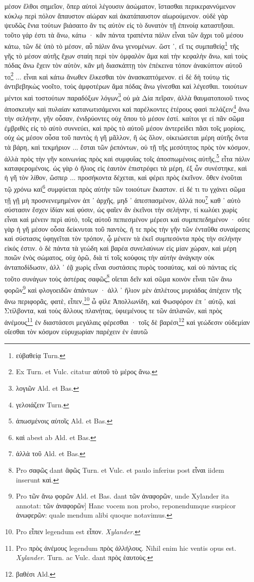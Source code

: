 \documentclass[a4paper, 11pt, oneside, polutonikogreek, german]{article}
\begin{document}
μέσον ἔλθοι σημεῖον, ὅπερ αὐτοὶ λέγουσιν ἀσώματον, ἵστασθαι περικεραννύμενον κύκλῳ περὶ πόλον ἄπαυστον αἰώραν καὶ ἀκατάπαυστον αἰωρούμενον. οὐδὲ γὰρ ψευδῶς ἔνια τούτων βιάσαιτο ἄν τις αὐτὸν εἰς τὸ δυνατὸν τῇ ἐπινοίᾳ καταστῆσαι. τοῦτο γάρ ἐστι τὰ ἄνω, κάτω · κἂν πάντα τραπέντα πάλιν εἶναι τῶν ἄχρι τοῦ μέσου κάτω, τῶν δὲ ὑπὸ τὸ μέσον, αὖ πάλιν ἄνω γενομένων. ὥστ ᾽, εἴ τις συμπαθείᾳ\footnote{εὐβαθείᾳ Turn.} τῆς γῆς τὸ μέσον αὐτῆς ἔχων σταίη περὶ τὸν ὀμφαλὸν ἅμα καὶ τὴν κεφαλὴν ἄνω, καὶ τοὺς πόδας ἄνω ἔχειν τὸν αὐτὸν, κἂν μὴ διασκάπτῃ τὸν ἐπέκεινα τόπον ἀνακύπτον αὐτοῦ το\footnote{Ex Turn. et Vulc. citatur αὐτοῦ τὸ μέρος ἄνω.} ... εἶναι καὶ κάτω ἄνωθεν ἕλκεσθαι τὸν ἀνασκαπτόμενον. εἰ δὲ δὴ τούτῳ τὶς ἀντιβεβηκὼς νοοῖτο, τοὺς ἀμφοτέρων ἅμα πόδας ἄνω γίνεσθαι καὶ λέγεσθαι. τοιούτων μέντοι καὶ τοστούτων παραδόξων λόγων\footnote{λογιῶν Ald. et Bas.} οὐ μὰ Δία πεῖραν, ἀλλὰ θαυματοποιοῦ τινος ἀποσκευὴν καὶ πυλαίαν κατανωτισάμενοι καὶ παρέλκοντες ἑτέρους φασὶ πελάζειν\footnote{γελοιάζειν Turn.} ἄνω τὴν σελήνην, γῆν οὖσαν, ἐνιδρύοντες οὐχ ὅπου τὸ μέσον ἐστί. καίτοι γε εἰ πᾶν σῶμα ἐμβριθὲς εἰς τὸ αὐτὸ συννεύει, καὶ πρὸς τὸ αὐτοῦ μέσον ἀντερείδει πᾶσι τοῖς μορίοις, οὐχ ὡς μέσον οὖσα τοῦ παντὸς ἡ γῆ μᾶλλον, ἢ ὡς ὅλον, οἰκειώσεται μέρη αὐτῆς ὄντα τὰ βάρη, καὶ τεκμήριον ... ἔσται τῶν ῥεπόντων, οὐ τῇ τῆς μεσότητος πρὸς τὸν κόσμον, ἀλλὰ πρὸς τὴν γῆν κοινωνίας πρὸς καὶ συμφυΐας τοῖς ἀποσπωμένοις αὐτῆς,\footnote{ἀπωσμένοις αὐτοῖς Ald. et Bas.} εἶτα πάλιν καταφερομένοις. ὡς γὰρ ὁ ἥλιος εἰς ἑαυτὸν ἐπιστρέφει τὰ μέρη, ἐξ ὧν συνέστηκε, καὶ ἡ γῆ τὸν λίθον, ὥσπερ ... προσήκοντα δέχεται, καὶ φέρει πρὸς ἐκεῖνον. ὅθεν ἑνοῦται τῷ χρόνω καὶ\footnote{καὶ abest ab Ald. et Bas.} συμφύεται πρὸς αὐτὴν τῶν τοιούτων ἕκαστον. εἰ δέ τι τυ γχάνει σῶμα τῇ γῇ μὴ προσνενεμημένον ἀπ ᾽ ἀρχῆς, μηδ ᾽ ἀπεσπασμένον, ἀλλά που\footnote{ἀλλὰ τοῦ Ald. et Bas.} καθ ᾽ αὑτὸ σύστασιν ἔσχεν ἰδίαν καὶ φύσιν, ὡς φαῖεν ἂν ἐκεῖνοι τὴν σελήνην, τί κωλύει χωρὶς εἶναι καὶ μένειν περὶ αὐτὸ, τοῖς αὐτοῦ πεπιεσμένον μέρεσι καὶ συμπεπεδημένον · οὔτε γὰρ ἡ γῆ μέσον οὖσα δείκνυται τοῦ παντὸς, ἥ τε πρὸς τὴν γῆν τῶν ἐνταῦθα συναίρεσις καὶ σύστασις ὑφηγεῖται τὸν τρόπον, ᾧ μένειν τὰ ἐκεῖ συμπεσόντα πρὸς τὴν σελήνην εἰκός ἐστιν. ὁ δὲ πάντα τὰ γεώδη καὶ βαρέα συνελαύνων εἰς μίαν χώραν, καὶ μέρη ποιῶν ἑνὸς σώματος, οὐχ ὁρῶ, διὰ τί τοῖς κούφοις τὴν αὐτὴν ἀνάγκην οὐκ ἀνταποδίδωσιν, ἀλλ ᾽ ἐᾷ χωρὶς εἶναι συστάσεις πυρὸς τοσαύτας, καὶ οὐ πάντας εἰς τοῦτο συνάγων τοὺς ἀστέρας σαφῶς\footnote{Pro σαφῶς dant ἃφῶς Turn. et Vulc. et paulo inferius post εἶναι iidem inserunt καὶ.} οἴεται δεῖν καὶ σῶμα κοινὸν εἶναι τῶν ἄνω φορῶν\footnote{Pro τῶν ἄνω φορῶν Ald. et Bas. dant τῶν ἀναφορῶν, unde Xylander ita annotat: τῶν ἀναφορῶν] Hanc vocem non probo, reponendumque suspicor ἀνωφερῶν: quale mendum alibi quoque notavimus.} καὶ φλογοειδῶν ἁπάντων · ἀλλ ᾽ ἥλιον μὲν ἀπλέτους μυριάδας ἀπέχειν τῆς ἄνω περιφορᾶς, φατὲ, εἶπεν,\footnote{Pro εἶπεν legendum est εἶπον. \emph{Xylander.}} ὦ φίλε Ἀπολλωνίδη, καὶ Φωσφόρον ἐπ ᾽ αὐτῷ, καὶ Στίλβοντα, καὶ τοὺς ἄλλους πλανήτας, ὑφιεμένους τε τῶν ἀπλανῶν, καὶ πρὸς ἀνέμους\footnote{Pro πρὸς ἀνέμους legendum πρὸς ἀλλήλους. Nihil enim hic ventis opus est. \emph{Xylander.} Turn. ac Vulc. dant πρὸς ἑαυτοὺς.} ἐν διαστάσεσι μεγάλαις φέρεσθαι · τοῖς δὲ βαρέσι\footnote{βαθέσι Ald.} καὶ γεώδεσιν οὐδεμίαν οἴεσθαι τὸν κόσμον εὐρυχωρίαν παρέχειν ἐν ἑαυτῶ 
\end{document}
